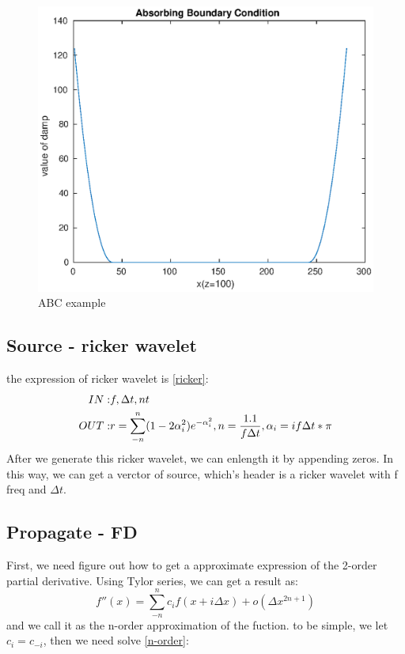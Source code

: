 \documentclass[a4paper]{article}
\begin{document}
		\begin{figure}
			\centering
			\includegraphics[width=0.5\linewidth]{fig/ABC.eps}
			\caption{ABC example}
			\label{ABCfigure}
		\end{figure}

	\subsection{Source - ricker wavelet}
		the expression of ricker wavelet is \autoref{ricker}:
		\begin{equation}
			\begin{aligned}
				IN: & f, \Delta t, nt\\
				OUT:& r = \sum_{-n}^{n}(1-2\alpha_i^2 )e^{- \alpha_i^2 }, n = \frac{1.1}{f\Delta t}, \alpha_i = if\Delta t * \pi
			\end{aligned}
			\label{ricker}
			\centering
		\end{equation}
		After we generate this ricker wavelet, we can enlength it by appending zeros. In this way, we can get a verctor of source, which's header is a ricker wavelet with f freq and $\Delta t$.
	
	\subsection{Propagate - FD}

		First, we need figure out how to get a approximate expression of the 2-order partial derivative. Using Tylor series, we can get a result as:
			$$f''(x)=\sum_{-n}^{n}c_{i}f(x+i\Delta x) + o(\Delta x ^{2n+1})$$
		and we call it as the n-order approximation of the fuction. to be simple, we let $c_i=c_{-i}$, then we need solve \autoref{n-order}:
\end{document}
